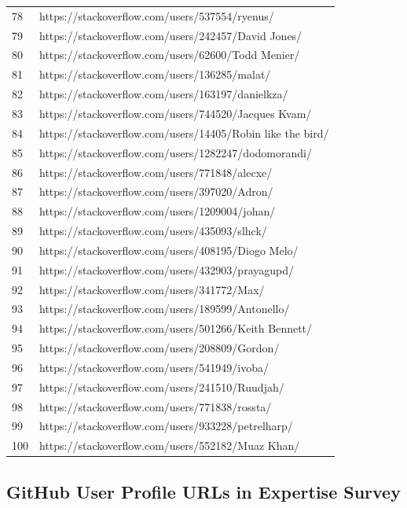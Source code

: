 \begin{center}
\begin{longtable}{|p{1.5cm}|p{12.5cm}|}
78 & https://stackoverflow.com/users/537554/ryenus/ \\
79 & https://stackoverflow.com/users/242457/David Jones/ \\
80 & https://stackoverflow.com/users/62600/Todd Menier/ \\
81 & https://stackoverflow.com/users/136285/malat/ \\
82 & https://stackoverflow.com/users/163197/danielkza/ \\
83 & https://stackoverflow.com/users/744520/Jacques Kvam/ \\
84 & https://stackoverflow.com/users/14405/Robin like the bird/ \\
85 & https://stackoverflow.com/users/1282247/dodomorandi/ \\
86 & https://stackoverflow.com/users/771848/alecxe/ \\
87 & https://stackoverflow.com/users/397020/Adron/ \\
88 & https://stackoverflow.com/users/1209004/johan/ \\
89 & https://stackoverflow.com/users/435093/slhck/ \\
90 & https://stackoverflow.com/users/408195/Diogo Melo/ \\
91 & https://stackoverflow.com/users/432903/prayagupd/ \\
92 & https://stackoverflow.com/users/341772/Max/ \\
93 & https://stackoverflow.com/users/189599/Antonello/ \\
94 & https://stackoverflow.com/users/501266/Keith Bennett/ \\
95 & https://stackoverflow.com/users/208809/Gordon/ \\
96 & https://stackoverflow.com/users/541949/ivoba/ \\
97 & https://stackoverflow.com/users/241510/Ruudjah/ \\
98 & https://stackoverflow.com/users/771838/rossta/ \\
99 & https://stackoverflow.com/users/933228/petrelharp/ \\
100 & https://stackoverflow.com/users/552182/Muaz Khan/ \\
\hline
\end{longtable}
\end{center}


\subsection{GitHub User Profile URLs in Expertise Survey}

